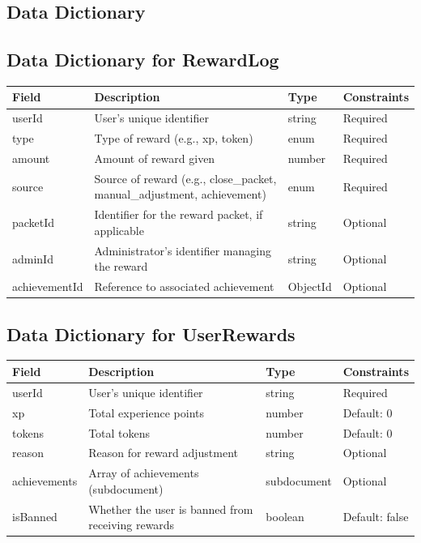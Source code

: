\subsection{Data Dictionary}

\subsection{Data Dictionary for RewardLog}
\begin{tabular}{|l|p{9cm}|l|l|}
\hline
\textbf{Field} & \textbf{Description} & \textbf{Type} & \textbf{Constraints} \\
\hline
userId & User's unique identifier & string & Required \\
\hline
type & Type of reward (e.g., xp, token) & enum & Required \\
\hline
amount & Amount of reward given & number & Required \\
\hline
source & Source of reward (e.g., close\_packet, manual\_adjustment, achievement) & enum & Required \\
\hline
packetId & Identifier for the reward packet, if applicable & string & Optional \\
\hline
adminId & Administrator's identifier managing the reward & string & Optional \\
\hline
achievementId & Reference to associated achievement & ObjectId & Optional \\
\hline
\end{tabular}

\subsection{Data Dictionary for UserRewards}
\begin{tabular}{|l|l|l|l|}
\hline
\textbf{Field} & \textbf{Description} & \textbf{Type} & \textbf{Constraints} \\
\hline
userId & User's unique identifier & string & Required \\
\hline
xp & Total experience points & number & Default: 0 \\
\hline
tokens & Total tokens & number & Default: 0 \\
\hline
reason & Reason for reward adjustment & string & Optional \\
\hline
achievements & Array of achievements (subdocument) & subdocument & Optional \\
\hline
isBanned & Whether the user is banned from receiving rewards & boolean & Default: false \\
\hline
\end{tabular}

